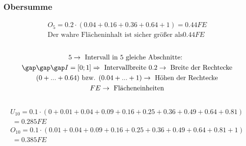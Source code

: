 \subsubsection{Obersumme}
\begin{gather*}
  O_5 = 0.2 \cdot (0.04 + 0.16 + 0.36 + 0.64 + 1) = 0.44FE \\
  \text{Der wahre Flächeninhalt ist sicher größer als} 0.44FE
\end{gather*} \\
\begin{gather*}
  5 \rightarrow \text{ Intervall in $5$ gleiche Abschnitte: } \\
  \gap\gap\gap I = \left[0; 1\right] \Rightarrow \text{ Intervallbreite } 0.2 \rightarrow \text{ Breite der Rechtecke} \\
  (0 + ... + 0.64) \text{ bzw. } (0.04 + ... + 1) \rightarrow \text{ Höhen der Rechtecke} \\
  FE \rightarrow \text{ Flächeneinheiten}
\end{gather*} \\
\begin{gather*}
  U_{10} = 0.1 \cdot (0 + 0.01 + 0.04 + 0.09 + 0.16 + 0.25 + 0.36 + 0.49 + 0.64 + 0.81) \\
  \;= 0.285FE \\
  O_{10} = 0.1 \cdot (0.01 + 0.04 + 0.09 + 0.16 + 0.25 + 0.36 + 0.49 + 0.64 + 0.81 + 1) \\
  \;= 0.385FE
\end{gather*}
